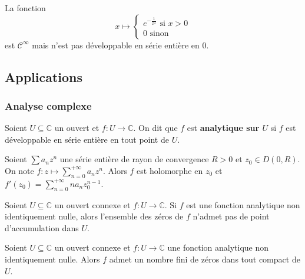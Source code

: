 
  \begin{cexample}
    La fonction
    \[
    x \mapsto \begin{cases}
      e^{-\frac{1}{x^2}} \text{ si } x > 0 \\
      0 \text{ sinon}
    \end{cases}
    \]
    est $\mathcal{C}^\infty$ mais n'est pas développable en série entière en $0$.
  \end{cexample}

  \subsection{Applications}

  \subsubsection{Analyse complexe}


  \begin{definition}
    Soient $U \subseteq \mathbb{C}$ un ouvert et $f : U \rightarrow \mathbb{C}$. On dit que $f$ est \textbf{analytique sur $U$} si $f$ est développable en série entière en tout point de $U$.
  \end{definition}

  \begin{theorem}
    Soient $\sum a_n z^n$ une série entière de rayon de convergence $R > 0$ et $z_0 \in D(0,R)$. On note $f : z \mapsto \sum_{n=0}^{+\infty} a_n z^n$.
    Alors $f$ est holomorphe en $z_0$ et $f'(z_0) = \sum_{n=0}^{+\infty} n a_n z_0^{n-1}$.
  \end{theorem}

  \begin{theorem}
    Soient $U \subseteq \mathbb{C}$ un ouvert connexe et $f : U \rightarrow \mathbb{C}$. Si $f$ est une fonction analytique non identiquement nulle, alors l'ensemble des zéros de $f$ n'admet pas de point d'accumulation dans $U$.
  \end{theorem}

  \begin{corollary}
    Soient $U \subseteq \mathbb{C}$ un ouvert connexe et $f : U \rightarrow \mathbb{C}$ une fonction analytique non identiquement nulle. Alors $f$ admet un nombre fini de zéros dans tout compact de $U$.
  \end{corollary}


